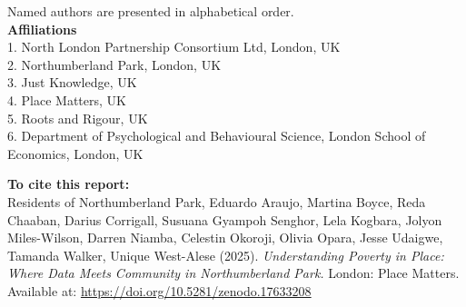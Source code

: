 

% 

% 


\begin{flushleft}
Named authors are presented in alphabetical order. \\
\vspace{0.5cm} 
\textbf{Affiliations} \\

{\small
1. North London Partnership Consortium Ltd, London, UK \\
2. Northumberland Park, London, UK \\
3. Just Knowledge, UK \\
4. Place Matters, UK \\
5. Roots and Rigour, UK \\
6. Department of Psychological and Behavioural Science, London School of Economics, London, UK \\
}
\end{flushleft}

\textbf{To cite this report:}\\ 
Residents of Northumberland Park, Eduardo Araujo, Martina Boyce, Reda Chaaban, 
Darius Corrigall, Susuana Gyampoh Senghor, Lela Kogbara, Jolyon Miles-Wilson, 
Darren Niamba, Celestin Okoroji, Olivia Opara, Jesse Udaigwe, Tamanda Walker, 
Unique West-Alese (2025). 
\textit{Understanding Poverty in Place: Where Data Meets Community in 
Northumberland Park.} London: Place Matters. Available at: \href{https://doi.org/10.5281/zenodo.17633208}{https://doi.org/10.5281/zenodo.17633208}

\newpage

\vspace{2cm}

